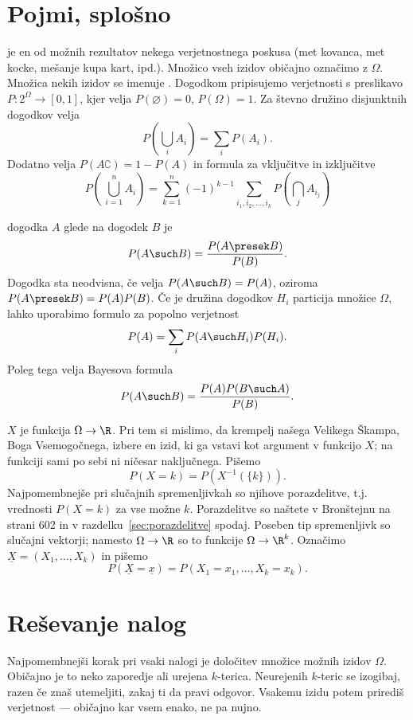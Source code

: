\section{Pojmi, splošno}

 je en od možnih rezultatov nekega verjetnostnega poskusa (met
kovanca, met kocke, mešanje kupa kart, ipd.).
Množico vseh izidov običajno označimo z $\Omega$.
Množica nekih izidov se imenuje .
Dogodkom pripisujemo verjetnosti s preslikavo $P: 2^\Omega \to [0,1]$,
kjer velja $P(\varnothing) = 0$, $P(\Omega) = 1$.
Za števno družino disjunktnih dogodkov velja
\[
  P\left( \bigcup_i A_i \right) = \sum_i P(A_i).
\]
Dodatno velja $P(A\complement) = 1 - P(A)$ in formula za vključitve in
izključitve
\[
  P\!\left(\,\bigcup_{i=1}^n A_i \right)
  = \sum_{k = 1}^n {(-1)}^{k-1} \sum_{i_1, i_2, \ldots, i_k}
    P\!\left( \bigcap_j A_{i_j} \right)
\]

 dogodka $A$ glede na dogodek $B$ je
\[
  P(A \such B) = \frac{P(A \presek B)}{P(B)}.
\]
Dogodka sta neodvisna, če velja $P(A \such B) = P(A)$, oziroma
$P(A \presek B) = P(A) P(B)$.
Če je družina dogodkov $H_i$ particija množice $\Omega$, lahko uporabimo formulo
za popolno verjetnost
\[
  P(A) = \sum_i P(A \such H_i) P(H_i).
\]
Poleg tega velja Bayesova formula
\[
  P(A \such B) = \frac{P(A) P(B \such A)}{P(B)}.
\]

 $X$ je funkcija $\Omega \to \R$.
Pri tem si mislimo, da krempelj našega Velikega Škampa, Boga Vsemogočnega,
izbere en izid, ki ga vstavi kot argument v funkcijo $X$; na funkciji sami po
sebi ni ničesar naključnega.
Pišemo
\[
  P(X = k) = P(X^{-1}(\{k\})).
\]
Najpomembnejše pri slučajnih spremenljivkah so njihove porazdelitve, t.j.
vrednosti $P(X = k)$ za vse možne $k$.
Porazdelitve so naštete v Bronštejnu na strani 602 in v
razdelku~\ref{sec:porazdelitve} spodaj.
Poseben tip spremenljivk so slučajni vektorji; namesto $\Omega \to \R$ so to
funkcije $\Omega \to \R^k$.
Označimo $\underline{X} = (X_1, \ldots, X_k)$ in pišemo
\[
  P(\underline{X} = \underline{x}) = P(X_1 = x_1, \ldots, X_k = x_k).
\]

\section{Reševanje nalog}

Najpomembnejši korak pri vsaki nalogi je določitev množice možnih izidov
$\Omega$.
Običajno je to neko zaporedje ali urejena $k$-terica.
Neurejenih $k$-teric se izogibaj, razen če znaš utemeljiti, zakaj ti da pravi
odgovor.
Vsakemu izidu potem prirediš verjetnost --- običajno kar vsem enako, ne pa
nujno.

